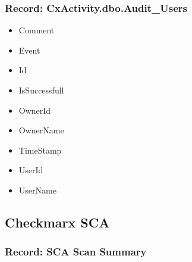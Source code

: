 \subsubsection{Record: CxActivity.dbo.Audit\_Users}
\begin{itemize}
    \item Comment
    \item Event
    \item Id
    \item IsSuccessfull
    \item OwnerId
    \item OwnerName
    \item TimeStamp
    \item UserId
    \item UserName
\end{itemize}


\subsection{Checkmarx SCA}


\subsubsection{Record: SCA Scan Summary}


